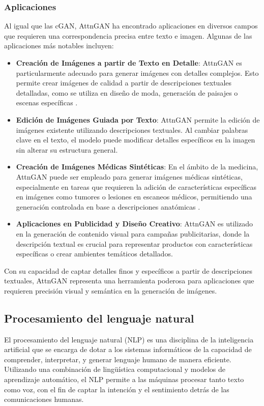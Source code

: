 \subsubsection{Aplicaciones}
Al igual que las cGAN, AttnGAN ha encontrado aplicaciones en diversos campos que requieren una correspondencia precisa entre texto e imagen. Algunas de las aplicaciones más notables incluyen:
\begin{itemize} 
    \item \textbf{Creación de Imágenes a partir de Texto en Detalle}: AttnGAN es particularmente adecuado para generar imágenes con detalles complejos. Esto permite crear imágenes de calidad a partir de descripciones textuales detalladas, como se utiliza en diseño de moda, generación de paisajes o escenas específicas \cite{xu2018attngan}.
    \item \textbf{Edición de Imágenes Guiada por Texto}: AttnGAN permite la edición de imágenes existente utilizando descripciones textuales. Al cambiar palabras clave en el texto, el modelo puede modificar detalles específicos en la imagen sin alterar su estructura general.
    \item \textbf{Creación de Imágenes Médicas Sintéticas}: En el ámbito de la medicina, AttnGAN puede ser empleado para generar imágenes médicas sintéticas, especialmente en tareas que requieren la adición de características específicas en imágenes como tumores o lesiones en escaneos médicos, permitiendo una generación controlada en base a descripciones anatómicas \cite{liu2019medgan}.
    \item \textbf{Aplicaciones en Publicidad y Diseño Creativo}: AttnGAN es utilizado en la generación de contenido visual para campañas publicitarias, donde la descripción textual es crucial para representar productos con características específicas o crear ambientes temáticos detallados.
\end{itemize}

Con su capacidad de captar detalles finos y específicos a partir de descripciones textuales, AttnGAN representa una herramienta poderosa para aplicaciones que requieren precisión visual y semántica en la generación de imágenes.


\subsection{Procesamiento del lenguaje natural}
El procesamiento del lenguaje natural (NLP) es una disciplina de la inteligencia artificial que se encarga de dotar a los sistemas informáticos de la capacidad de comprender, interpretar, y generar lenguaje humano de manera eficiente. Utilizando una combinación de lingüística computacional y modelos de aprendizaje automático, el NLP permite a las máquinas procesar tanto texto como voz, con el fin de captar la intención y el sentimiento detrás de las comunicaciones humanas.

